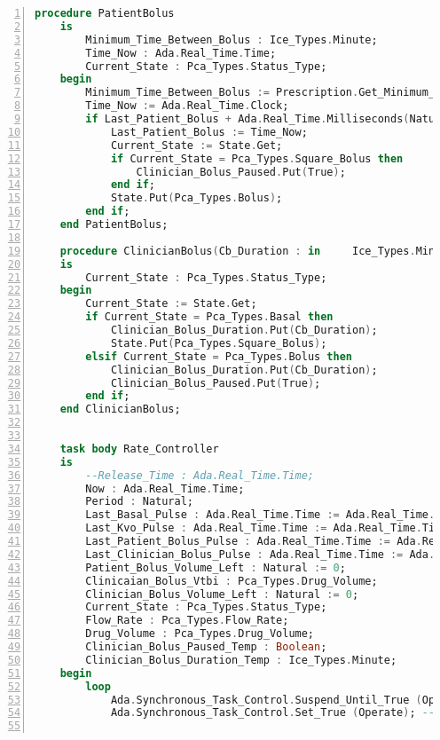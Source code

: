 \begin{lstlisting}[language=ada, gobble=0, numbers=left, caption={\lstinline{Pca_Operation} package}, label={listing:pca_ravenscar:pca_operation}]
    procedure PatientBolus
    is
        Minimum_Time_Between_Bolus : Ice_Types.Minute;
        Time_Now : Ada.Real_Time.Time;
        Current_State : Pca_Types.Status_Type;
    begin
        Minimum_Time_Between_Bolus := Prescription.Get_Minimum_Time_Between_Bolus;
        Time_Now := Ada.Real_Time.Clock;
        if Last_Patient_Bolus + Ada.Real_Time.Milliseconds(Natural(Minimum_Time_Between_Bolus)*(60*1000)) <= Time_Now then
            Last_Patient_Bolus := Time_Now;
            Current_State := State.Get;
            if Current_State = Pca_Types.Square_Bolus then
                Clinician_Bolus_Paused.Put(True);
            end if;
            State.Put(Pca_Types.Bolus);
        end if;
    end PatientBolus;

    procedure ClinicianBolus(Cb_Duration : in     Ice_Types.Minute)
    is
        Current_State : Pca_Types.Status_Type;
    begin
        Current_State := State.Get;
        if Current_State = Pca_Types.Basal then
            Clinician_Bolus_Duration.Put(Cb_Duration);
            State.Put(Pca_Types.Square_Bolus);
        elsif Current_State = Pca_Types.Bolus then
            Clinician_Bolus_Duration.Put(Cb_Duration);
            Clinician_Bolus_Paused.Put(True);
        end if;
    end ClinicianBolus;


    task body Rate_Controller
    is
        --Release_Time : Ada.Real_Time.Time;
        Now : Ada.Real_Time.Time;
        Period : Natural;
        Last_Basal_Pulse : Ada.Real_Time.Time := Ada.Real_Time.Time_First; -- Ada.Real_Time.Clock - Ada.Real_Time.Milliseconds(1000 * 60 * 60);
        Last_Kvo_Pulse : Ada.Real_Time.Time := Ada.Real_Time.Time_First; -- Ada.Real_Time.Clock - Ada.Real_Time.Milliseconds(1000 * 60 * 60);
        Last_Patient_Bolus_Pulse : Ada.Real_Time.Time := Ada.Real_Time.Time_First; -- Ada.Real_Time.Clock - Ada.Real_Time.Milliseconds(1000 * 60 * 60);
        Last_Clinician_Bolus_Pulse : Ada.Real_Time.Time := Ada.Real_Time.Time_First; -- Ada.Real_Time.Clock - Ada.Real_Time.Milliseconds(1000 * 60 * 60);
        Patient_Bolus_Volume_Left : Natural := 0;
        Clinicaian_Bolus_Vtbi : Pca_Types.Drug_Volume;
        Clinician_Bolus_Volume_Left : Natural := 0;
        Current_State : Pca_Types.Status_Type;
        Flow_Rate : Pca_Types.Flow_Rate;
        Drug_Volume : Pca_Types.Drug_Volume;
        Clinician_Bolus_Paused_Temp : Boolean;
        Clinician_Bolus_Duration_Temp : Ice_Types.Minute;
    begin
        loop
            Ada.Synchronous_Task_Control.Suspend_Until_True (Operate); -- wait until user allows Pump to operate
            Ada.Synchronous_Task_Control.Set_True (Operate); -- Keep the task running, the previous call will have set Operate to False.


\end{lstlisting}
